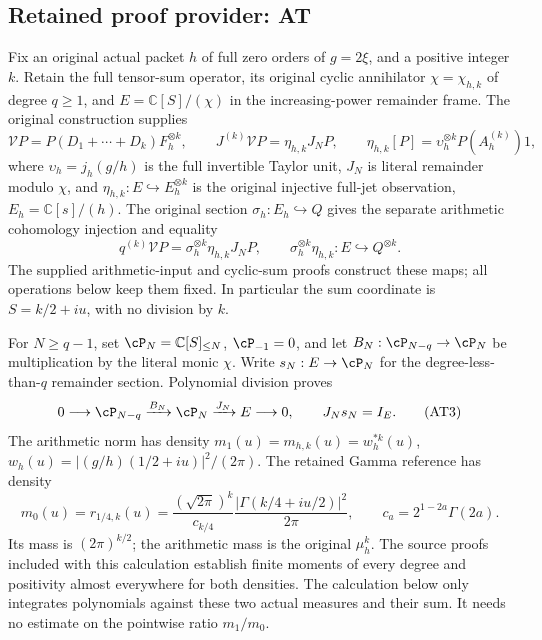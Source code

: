 \documentclass[11pt,a4paper]{article}
\newcommand{\C}{\mathbb C}
\begin{document}

\clearpage
\subsection*{Retained proof provider: AT}

Fix an original actual packet $h$ of full zero orders of $g=2\xi$,
and a positive integer $k$. Retain the full tensor-sum operator,
its original cyclic annihilator $\chi=\chi_{h,k}$ of degree $q\ge1$,
and $E=\C[S]/(\chi)$ in the increasing-power remainder frame.
The original construction supplies
\[
 \mathcal V P=P(D_1+\cdots+D_k)F_h^{\otimes k},\qquad
 J^{(k)}\mathcal V P=\eta_{h,k}J_NP,\qquad
 \eta_{h,k}[P]=\upsilon_h^{\otimes k}P(A_h^{(k)})1,
 \tag{AT2}
\]
where $\upsilon_h=j_h(g/h)$ is the full invertible Taylor unit,
$J_N$ is literal remainder modulo $\chi$, and
$\eta_{h,k}:E\hookrightarrow E_h^{\otimes k}$ is the original
injective full-jet observation, $E_h=\C[s]/(h)$.
The original section $\sigma_h:E_h\hookrightarrow Q$ gives the
separate arithmetic cohomology injection and equality
\[
 q^{(k)}\mathcal V P=\sigma_h^{\otimes k}\eta_{h,k}J_NP,
 \qquad \sigma_h^{\otimes k}\eta_{h,k}:E\hookrightarrow Q^{\otimes k}.
 \tag{AT2a}
\]
The supplied arithmetic-input and cyclic-sum proofs construct these
maps; all operations below keep them fixed. In
particular the sum coordinate is $S=k/2+iu$, with no division by $k$.

For $N\ge q-1$, set $\cP_N=\C[S]_{\le N}$,
$\cP_{-1}=0$, and let
$B_N:\cP_{N-q}\to\cP_N$ be multiplication by the literal monic
$\chi$. Write $s_N:E\to\cP_N$ for the degree-less-than-$q$
remainder section. Polynomial division proves
\[
 0\longrightarrow\cP_{N-q}\xrightarrow{B_N}\cP_N
       \xrightarrow{J_N}E\longrightarrow0,
 \qquad J_Ns_N=I_E.                         \tag{AT3}
\]
The arithmetic norm has density
$m_1(u)=m_{h,k}(u)=w_h^{*k}(u)$,
$w_h(u)=|(g/h)(1/2+iu)|^2/(2\pi)$.
The retained Gamma reference has density
\[
 m_0(u)=r_{1/4,k}(u)
 =\frac{(\sqrt{2\pi})^k}{c_{k/4}}
       \frac{|\Gamma(k/4+iu/2)|^2}{2\pi},
 \qquad c_a=2^{1-2a}\Gamma(2a).              \tag{AT4}
\]
Its mass is $(2\pi)^{k/2}$; the arithmetic mass is the original
$\mu_h^k$. The source proofs included with this calculation establish
finite moments of every degree and positivity almost everywhere for
both densities. The calculation below only integrates polynomials
against these two actual measures and their sum. It needs no estimate
on the pointwise ratio $m_1/m_0$.
\end{document}
